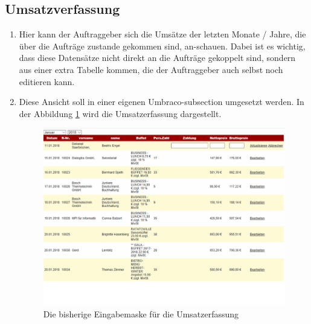 \subsection{Umsatzverfassung}
\begin{enumerate}
	\item Hier kann der Auftraggeber sich die Umsätze der letzten Monate / Jahre, die über die Aufträge zustande gekommen sind, an-schauen. Dabei ist es wichtig, dass diese Datensätze nicht direkt an die Aufträge gekoppelt sind, sondern aus einer extra Tabelle kommen, die der Auftraggeber auch selbst noch editieren kann.
	\item Diese Ansicht soll in einer eigenen Umbraco-subsection umgesetzt werden.
	In der Abbildung \ref{fig:Umsatzerfassung} wird die Umsatzerfassung dargestellt.
	
		\begin{figure}[h]
		\centering
		\includegraphics[width=0.6\linewidth]{Graphics/umsatzErfassung.png}
		\caption[Uebersicht]{Die bisherige Eingabemaske für die Umsatzerfassung}
		\label{fig:Umsatzerfassung}
	\end{figure}
	
\end{enumerate} 


